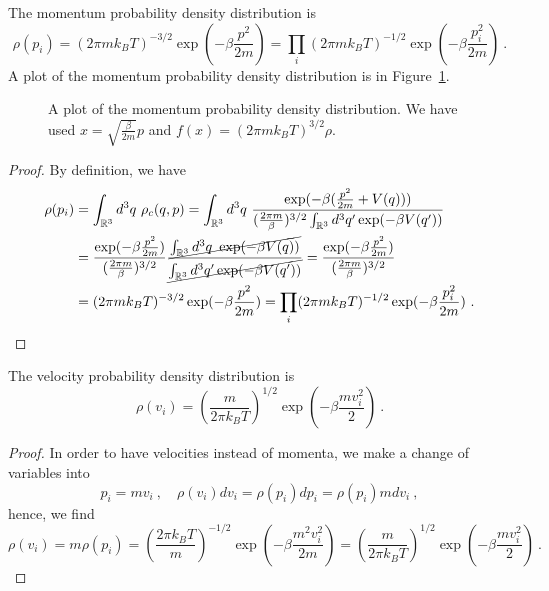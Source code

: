     The momentum probability density distribution is 
    \begin{equation*}
        \rho(p_i) = (2\pi m k_B T)^{-3/2} \exp(- \beta \frac{p^2}{2m}) = \prod_i (2\pi m k_B T)^{-1/2} \exp(- \beta \frac{p^2_i}{2m}) ~.
    \end{equation*}
    A plot of the momentum probability density distribution is in Figure~\ref{fig:mb:mom}.
    \begin{figure}
        \centering
        \caption{A plot of the momentum probability density distribution. We have used $x = \sqrt{\frac{\beta}{2m}} p$ and $f(x) = (2\pi m k_B T)^{3/2} \rho$.}
        \label{fig:mb:mom}
    \end{figure}
    \begin{proof}
        By definition, we have
        \begin{equation*}
        \begin{aligned}
            \rho(p_i) & = \int_{\mathbb R^3} d^3 q ~ \rho_c (q, p) = \int_{\mathbb R^3} d^3 q ~ \frac{\exp (- \beta ( \frac{p^2}{2m} + V(q) ))}{(\frac{2\pi m}{\beta})^{3/2} \int_{\mathbb R^3} d^3 q' \exp(- \beta V(q'))} \\ & = \frac{\exp(- \beta \frac{p^2}{2m})}{(\frac{2\pi m}{\beta})^{3/2}} \frac{\cancel{\int_{\mathbb R^3} d^3 q ~ \exp (- \beta V(q) )}}{\cancel{\int_{\mathbb R^3} d^3 q' \exp(- \beta V(q'))}} = \frac{\exp(- \beta \frac{p^2}{2m})}{(\frac{2\pi m}{\beta})^{3/2}} \\ & = (2\pi m k_B T)^{-3/2} \exp(- \beta \frac{p^2}{2m}) = \prod_i (2\pi m k_B T)^{-1/2} \exp(- \beta \frac{p^2_i}{2m}) ~.
        \end{aligned}
        \end{equation*}
    \end{proof}
    
    The velocity probability density distribution is
    \begin{equation*}
        \rho(v_i) = (\frac{m}{2\pi k_B T})^{1/2} \exp(- \beta \frac{m v^2_i}{2}) ~.
    \end{equation*}
    \begin{proof}
        In order to have velocities instead of momenta, we make a change of variables into
        \begin{equation*}
            p_i = m v_i ~, \quad \rho(v_i) dv_i = \rho(p_i) dp_i = \rho(p_i) m dv_i ~,
        \end{equation*}
        hence, we find
        \begin{equation*}
            \rho(v_i) = m \rho (p_i) = (\frac{2\pi k_B T}{m})^{-1/2} \exp(- \beta \frac{m^2 v^2_i}{2m}) = (\frac{m}{2\pi k_B T})^{1/2} \exp(- \beta \frac{m v^2_i}{2}) ~.
        \end{equation*}
    \end{proof}

